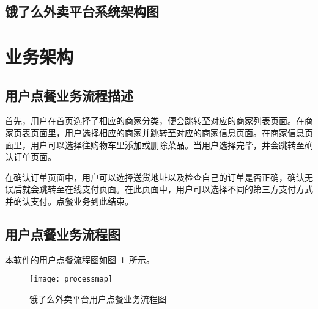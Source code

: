 \subsection{饿了么外卖平台系统架构图}

\section{业务架构}
\subsection{用户点餐业务流程描述}
首先，用户在首页选择了相应的商家分类，便会跳转至对应的商家列表页面。在商家页表页面里，用户选择相应的商家并跳转至对应的商家信息页面。在商家信息页面里，用户可以选择往购物车里添加或删除菜品。当用户选择完毕，并会跳转至确认订单页面。

在确认订单页面中，用户可以选择送货地址以及检查自己的订单是否正确，确认无误后就会跳转至在线支付页面。在此页面中，用户可以选择不同的第三方支付方式并确认支付。点餐业务到此结束。
\subsection{用户点餐业务流程图}
本软件的用户点餐流程图如图~\ref{fig:process}~所示。
\begin{figure}[htbp]
    \centering
    \texttt{[image: processmap]}
    \caption{饿了么外卖平台用户点餐业务流程图}\label{fig:process}
    \vspace{\baselineskip}
\end{figure}

